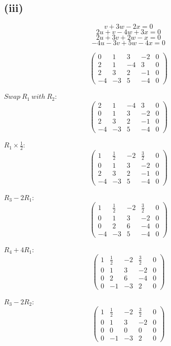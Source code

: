 \subsection*{(iii)}
\[
	v + 3w - 2x = 0
\]
\[
	2u + v - 4w + 3x = 0
\]
\[
	2u + 3v + 2w - x = 0
\]
\[
	-4u - 3v + 5w - 4x = 0
\]

\[
	\begin{pmatrix}
		0  & 1  & 3  & -2 & 0 \\
		2  & 1  & -4 & 3  & 0 \\
		2  & 3  & 2  & -1 & 0 \\
		-4 & -3 & 5  & -4 & 0
	\end{pmatrix}
\]

$Swap\ R_1\ with\ R_2$:
\[
	\begin{pmatrix}
		2  & 1  & -4 & 3  & 0 \\
		0  & 1  & 3  & -2 & 0 \\
		2  & 3  & 2  & -1 & 0 \\
		-4 & -3 & 5  & -4 & 0
	\end{pmatrix}
\]

$R_1 \times \frac{1}{2}$:
\[
	\begin{pmatrix}
		1  & \frac{1}{2} & -2 & \frac{3}{2} & 0 \\
		0  & 1           & 3  & -2          & 0 \\
		2  & 3           & 2  & -1          & 0 \\
		-4 & -3          & 5  & -4          & 0
	\end{pmatrix}
\]

$R_3 - 2R_1$:
\[
	\begin{pmatrix}
		1 & \frac{1}{2} & -2 & \frac{3}{2} & 0 \\
		0 & 1           & 3  & -2          & 0 \\
		0 & 2           & 6  & -4          & 0 \\
		-4 & -3          & 5  & -4          & 0
	\end{pmatrix}
\]

$R_4 + 4R_1$:
\[
	\begin{pmatrix}
		1 & \frac{1}{2} & -2 & \frac{3}{2} & 0 \\
		0 & 1           & 3  & -2          & 0 \\
		0 & 2           & 6  & -4          & 0 \\
		0 & -1          & -3 & 2           & 0
	\end{pmatrix}
\]

$R_3 - 2R_2$:
\[
	\begin{pmatrix}
		1 & \frac{1}{2} & -2 & \frac{3}{2} & 0 \\
		0 & 1           & 3  & -2          & 0 \\
		0 & 0           & 0  & 0           & 0 \\
		0 & -1          & -3 & 2           & 0
	\end{pmatrix}
\]

